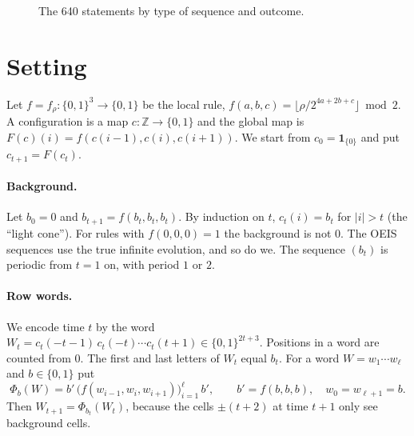 \documentclass[11pt]{article}
\theoremstyle{definition}
\theoremstyle{remark}
\begin{document}
\begin{figure}[ht]\centering
{}
\caption{The 640 statements by type of sequence and outcome.}\label{fig:bars}
\end{figure}

\section{Setting}

Let $f=f_\rho:\{0,1\}^3\to\{0,1\}$ be the local rule, $f(a,b,c)=\lfloor \rho/2^{4a+2b+c}\rfloor \bmod 2$. A configuration is a map $c:\mathbb Z\to\{0,1\}$ and the global map is $F(c)(i)=f(c(i-1),c(i),c(i+1))$. We start from $c_0=\mathbf 1_{\{0\}}$ and put $c_{t+1}=F(c_t)$.

\paragraph{Background.} Let $b_0=0$ and $b_{t+1}=f(b_t,b_t,b_t)$. By induction on $t$, $c_t(i)=b_t$ for $|i|>t$ (the ``light cone''). For rules with $f(0,0,0)=1$ the background is not $0$. The OEIS sequences use the true infinite evolution, and so do we. The sequence $(b_t)$ is periodic from $t=1$ on, with period $1$ or $2$.

\paragraph{Row words.} We encode time $t$ by the word $W_t=c_t(-t-1)\,c_t(-t)\cdots c_t(t+1)\in\{0,1\}^{2t+3}$. Positions in a word are counted from $0$. The first and last letters of $W_t$ equal $b_t$. For a word $W=w_1\cdots w_\ell$ and $b\in\{0,1\}$ put
\[
\Phi_b(W)=b'\,\bigl(f(w_{i-1},w_i,w_{i+1})\bigr)_{i=1}^{\ell}\,b',\qquad b'=f(b,b,b),\quad w_0=w_{\ell+1}=b.
\]
Then $W_{t+1}=\Phi_{b_t}(W_t)$, because the cells $\pm(t+2)$ at time $t+1$ only see background cells.
\end{document}
